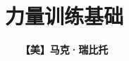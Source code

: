 \documentclass[a4paper, 12pt, openright]{ctexbook}
\begin{document}
\frontmatter

\title{\Huge \textbf{力量训练基础}}
\author{\textbf{【美】马克·瑞比托}}
\date{}

\maketitle



\tableofcontents

\mainmatter



\end{document}
